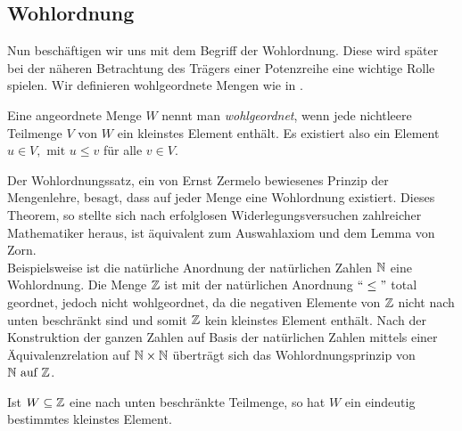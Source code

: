 \subsection{Wohlordnung}
Nun beschäftigen wir uns mit dem Begriff der Wohlordnung. Diese wird später bei der näheren Betrachtung des Trägers einer Potenzreihe eine wichtige Rolle spielen. Wir definieren wohlgeordnete Mengen wie in \cite[S. 16]{fuchs66}.
\begin{defn} \label{wohlgeordn} %
Eine angeordnete Menge $W$ nennt man \textit{wohlgeordnet}, wenn jede nichtleere Teilmenge $V$ von $W$ ein kleinstes Element enthält. Es existiert also ein Element $ u \in V, \text{ mit } u \le v $ für alle $ v \in V.$ 
\end{defn}
%
Der Wohlordnungssatz, ein von Ernst Zermelo bewiesenes Prinzip der Mengenlehre, besagt, dass auf jeder Menge eine Wohlordnung existiert. Dieses Theorem, so stellte sich nach erfolglosen Widerlegungsversuchen zahlreicher Mathematiker heraus, ist äquivalent zum Auswahlaxiom und dem Lemma von Zorn. \\
Beispielsweise ist die natürliche Anordnung der natürlichen Zahlen $\mathbb{N}$ eine Wohlordnung. Die Menge $\mathbb{Z}$ ist mit der natürlichen Anordnung $``\leq "$ total geordnet, jedoch nicht wohlgeordnet, da die negativen Elemente von $\mathbb{Z}$ nicht nach unten beschränkt sind und somit $\mathbb{Z}$ kein kleinstes Element enthält. Nach der Konstruktion der ganzen Zahlen auf Basis der natürlichen Zahlen mittels einer Äquivalenzrelation auf $\mathbb{N} \times \mathbb{N}$  überträgt sich das Wohlordnungsprinzip von $\mathbb{N} \text{ auf } \mathbb{Z}$.
\begin{bem} %
Ist $W \subseteq \mathbb{Z}$ eine nach unten beschränkte Teilmenge, so hat $W$ ein eindeutig bestimmtes kleinstes Element. 
\end{bem} 

